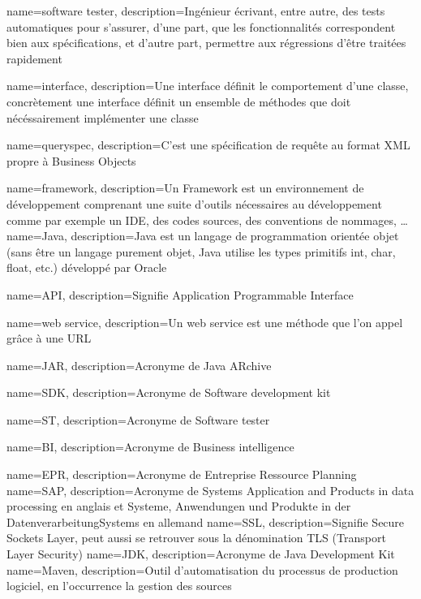 {
	name={software tester},
	description={Ingénieur écrivant, entre autre, des tests automatiques pour s'assurer, d'une part, que les fonctionnalités correspondent bien aux spécifications, et d'autre part, permettre aux régressions d'être traitées rapidement}
}

{
	name={interface},
	description={Une interface définit le comportement d'une classe, concrètement une interface définit un ensemble de méthodes que doit nécéssairement implémenter une classe}
}

{
	name={queryspec},
	description={C'est une spécification de requête au format XML propre à Business Objects}
}

{
	name={framework},
	description={Un Framework est un environnement de développement comprenant une suite d'outils nécessaires au développement comme par exemple un IDE, des codes sources, des conventions de nommages, \ldots}
}
{
	name={Java},
	description={Java est un langage de programmation orientée objet (sans être un langage purement objet, Java utilise les types primitifs int, char, float, etc.) développé par Oracle}
}

{
	name={API},
	description={Signifie Application Programmable Interface}
}

{
	name={web service},
	description={Un web service est une méthode que l'on appel grâce à une URL}
}


{
	name={JAR},
	description={Acronyme de Java ARchive}
}

{
	name={SDK},
	description={Acronyme de Software development kit}
}

{
	name={ST},
	description={Acronyme de Software tester}
}

{
	name={BI},
	description={Acronyme de Business intelligence}
}

{
	name={EPR},
	description={Acronyme de Entreprise Ressource Planning}
}
{
	name={SAP},
	description={Acronyme de Systems Application and Products in data processing en anglais et Systeme, Anwendungen und Produkte in der DatenverarbeitungSystems en allemand}
}
{
	name={SSL},
	description={Signifie Secure Sockets Layer, peut aussi se retrouver sous la dénomination TLS (Transport Layer Security)}
}
{
	name={JDK},
	description={Acronyme de Java Development Kit}
}
{
	name={Maven},
	description={Outil d'automatisation du processus de production logiciel, en l'occurrence la gestion des sources}
}

